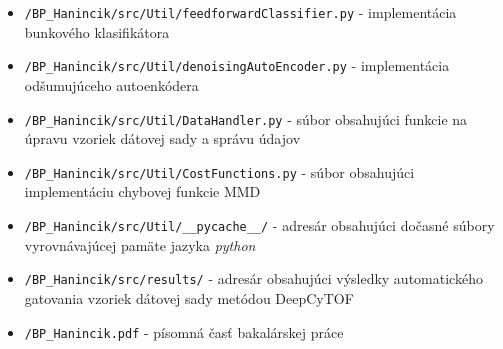 \begin{itemize}
    \item \texttt{/BP_Hanincik/src/Util/feedforwardClassifier.py} - implementácia bunkového klasifikátora
    \item \texttt{/BP_Hanincik/src/Util/denoisingAutoEncoder.py} - implementácia odšumujúceho autoenkódera
    \item \texttt{/BP_Hanincik/src/Util/DataHandler.py} - súbor obsahujúci funkcie na úpravu vzoriek dátovej sady a správu údajov
    \item \texttt{/BP_Hanincik/src/Util/CostFunctions.py} - súbor obsahujúci implementáciu chybovej funkcie MMD 
    \item \texttt{/BP_Hanincik/src/Util/__pycache__/} - adresár obsahujúci dočasné súbory vyrovnávajúcej pamäte jazyka \textit{python}
    \item \texttt{/BP_Hanincik/src/results/} - adresár obsahujúci výsledky automatického gatovania vzoriek dátovej sady metódou DeepCyTOF
    \item \texttt{/BP_Hanincik.pdf} - písomná časť bakalárskej práce
\end{itemize}